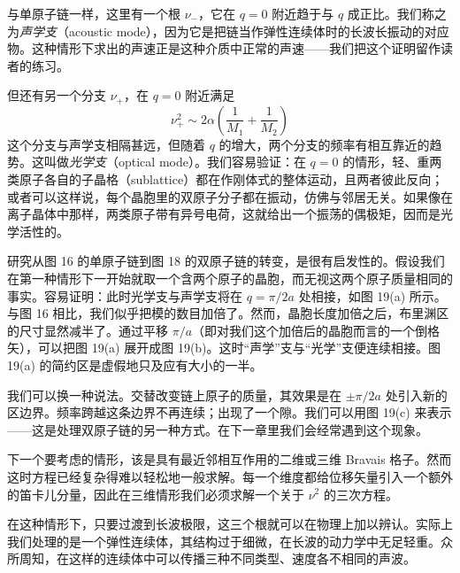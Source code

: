 

与单原子链一样，这里有一个根 $\nu_{-}$，它在 $q = 0$ 附近趋于与 $q$ 成正比。我们称之为\emph{声学支}（acoustic mode），因为它是把链当作弹性连续体时的长波长振动的对应物。这种情形下求出的声速正是这种介质中正常的声速——我们把这个证明留作读者的练习。

但还有另一个分支 $\nu_{+}$，在 $q = 0$ 附近满足
\begin{equation*}
\nu_{+}^{2} \sim 2\alpha \left( \frac{1}{M_1} + \frac{1}{M_2} \right)
\tag{2.25}
\end{equation*}
这个分支与声学支相隔甚远，但随着 $q$ 的增大，两个分支的频率有相互靠近的趋势。这叫做\emph{光学支}（optical mode）。我们容易验证：在 $q = 0$ 的情形，轻、重两类原子各自的子晶格（sublattice）都在作刚体式的整体运动，且两者彼此反向；或者可以这样说，每个晶胞里的双原子分子都在振动，仿佛与邻居无关。如果像在离子晶体中那样，两类原子带有异号电荷，这就给出一个振荡的偶极矩，因而是光学活性的。


研究从图 16 的单原子链到图 18 的双原子链的转变，是很有启发性的。假设我们在第一种情形下一开始就取一个含两个原子的晶胞，而无视这两个原子质量相同的事实。容易证明：此时光学支与声学支将在 $q = \pi/2a$ 处相接，如图 19(a) 所示。与图 16 相比，我们似乎把模的数目加倍了。然而，晶胞长度加倍之后，布里渊区的尺寸显然减半了。通过平移 $\pi/a$（即对我们这个加倍后的晶胞而言的一个倒格矢），可以把图 19(a) 展开成图 19(b)。这时“声学”支与“光学”支便连续相接。图 19(a) 的简约区是虚假地只及应有大小的一半。

我们可以换一种说法。交替改变链上原子的质量，其效果是在 $\pm \pi/2a$ 处引入新的区边界。频率跨越这条边界不再连续；出现了一个隙。我们可以用图 19(c) 来表示——这是处理双原子链的另一种方式。在下一章里我们会经常遇到这个现象。

下一个要考虑的情形，该是具有最近邻相互作用的二维或三维 Bravais 格子。然而这时方程已经复杂得难以轻松地一般求解。每一个维度都给位移矢量引入一个额外的笛卡儿分量，因此在三维情形我们必须求解一个关于 $\nu^2$ 的三次方程。

在这种情形下，只要过渡到长波极限，这三个根就可以在物理上加以辨认。实际上我们处理的是一个弹性连续体，其结构过于细微，在长波的动力学中无足轻重。众所周知，在这样的连续体中可以传播三种不同类型、速度各不相同的声波。


